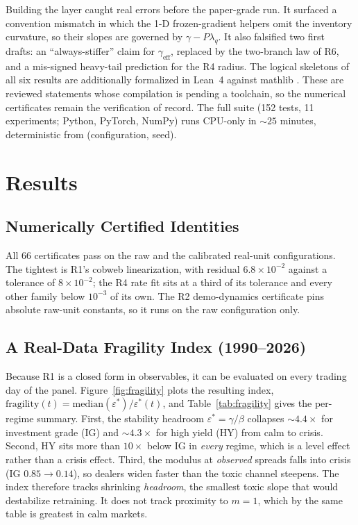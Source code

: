 \documentclass[sigconf,anonymous,review]{acmart}
\newcommand{\eps}{\varepsilon}
\newcommand{\geff}{\gamma_{\mathrm{eff}}}
\begin{document}
Building the layer caught real errors before the paper-grade run. It surfaced
a convention mismatch in which the 1-D frozen-gradient helpers omit the
inventory curvature, so their slopes are governed by $\gamma-P\lambda_q$. It
also falsified two first drafts: an ``always-stiffer'' claim for $\geff$,
replaced by the two-branch law of R6, and a mis-signed heavy-tail prediction
for the R4 radius. The logical skeletons of all six results are additionally
formalized in Lean~4 against mathlib \cite{moura2021lean,mathlib2020}. These
are reviewed statements whose compilation is pending a toolchain, so the
numerical certificates remain the verification of record. The full suite (152
tests, 11 experiments; Python, PyTorch, NumPy) runs CPU-only in ${\sim}25$
minutes, deterministic from (configuration, seed).

\section{Results}
\label{sec:results}

\subsection{Numerically Certified Identities}
All 66 certificates pass on the raw and the calibrated real-unit
configurations. The tightest is R1's cobweb linearization, with residual
$6.8{\times}10^{-2}$ against a tolerance of $8{\times}10^{-2}$; the R4 rate
fit sits at a third of its tolerance and every other family below
$10^{-3}$ of its own. The R2 demo-dynamics certificate pins absolute
raw-unit constants, so it runs on the raw configuration only.

\subsection{A Real-Data Fragility Index (1990--2026)}
\label{sec:fragility}
Because R1 is a closed form in observables, it can be evaluated on every
trading day of the panel. Figure~\ref{fig:fragility} plots the resulting
index, $\mathrm{fragility}(t)=\mathrm{median}(\eps^*)/\eps^*(t)$, and
Table~\ref{tab:fragility} gives the per-regime summary. First, the stability
headroom
$\eps^*=\gamma/\beta$ collapses
${\sim}4.4\times$ for investment grade (IG) and ${\sim}4.3\times$ for high
yield (HY) from calm to crisis. Second, HY sits more than $10\times$ below IG
in \emph{every} regime, which is a level effect rather than a crisis effect.
Third, the modulus at \emph{observed} spreads falls into crisis (IG
$0.85\to0.14$), so dealers widen faster than the toxic channel steepens.
The index therefore tracks shrinking \emph{headroom}, the smallest toxic
slope that would destabilize retraining. It does not track proximity to
$m=1$, which by the same table is greatest in calm markets.
\end{document}

